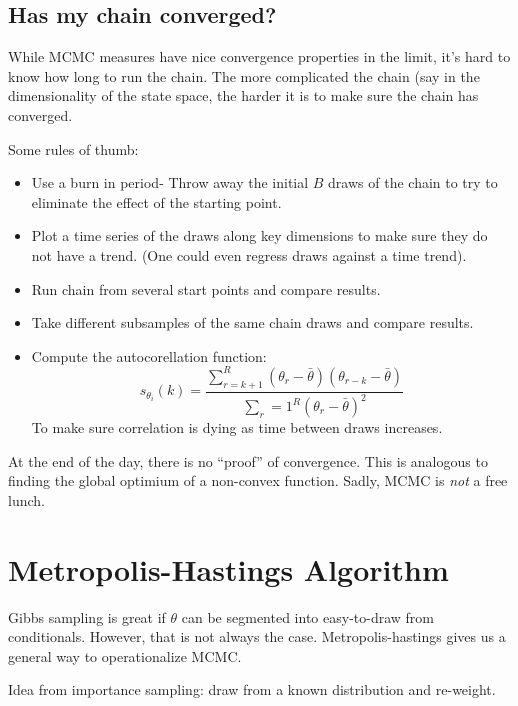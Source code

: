\documentclass[twoside]{article}
\begin{document}
\subsection{Has my chain converged?}

While MCMC measures have nice convergence properties in the limit, it's hard to know how long to run the chain.  The more complicated the chain (say in the dimensionality of the state space, the harder it is to make sure the chain has converged. 

Some rules of thumb: 
\begin{itemize}
\item Use a burn in period- Throw away the initial $B$ draws of the chain to try to eliminate the effect of the starting point. 
\item Plot a time series of the draws along key dimensions to make sure they do not have a trend. (One could even regress draws against a time trend). 
\item Run chain from several start points and compare results. 
\item Take different subsamples of the same chain draws and compare results.
\item Compute the autocorellation function: 
$$s_{\theta_i}(k) = \frac{ \sum_{r = k+1}^R (\theta_r - \bar{\theta})(\theta_{r-k} - \bar{\theta})}{ \sum_r=1^R  (\theta_r - \bar{\theta})^2} $$
To make sure correlation is dying as time between draws increases. 
\end{itemize}

At the end of the day, there is no ``proof'' of convergence. This is analogous to finding the global optimium of a non-convex function. 
Sadly, MCMC is \emph{not} a free lunch.

\section{Metropolis-Hastings Algorithm}

Gibbs sampling is great if $\theta$ can be segmented into easy-to-draw from conditionals. However, that is not always the case. 
Metropolis-hastings gives us a general way to operationalize MCMC. 

Idea from importance sampling: draw from a known distribution and re-weight. 
\end{document}
